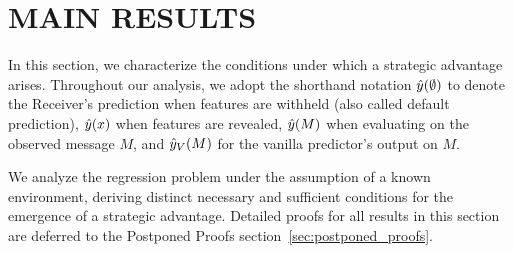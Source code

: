 \section{MAIN RESULTS}\label{sec:main_results}

In this section, we characterize the conditions under which a strategic advantage arises. Throughout our analysis, we adopt the shorthand notation $\hat{y}(\emptyset)$ to denote the Receiver's prediction when features are withheld (also called default prediction), $\hat{y}(x)$ when features are revealed, $\hat{y}(M)$ when evaluating on the observed message $M$, and $\hat{y}_V(M)$ for the vanilla predictor's output on $M$. 

We analyze the regression problem under the assumption of a known environment, deriving distinct necessary and sufficient conditions for the emergence of a strategic advantage. Detailed proofs for all results in this section are deferred to the Postponed Proofs section~\ref{sec:postponed_proofs}.


